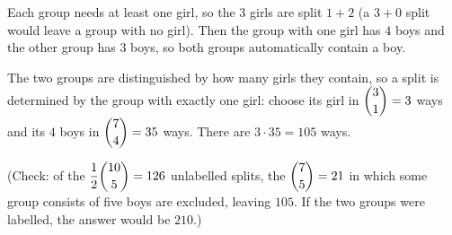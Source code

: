 Each group needs at least one girl, so the $3$ girls are split $1+2$ (a $3+0$ split would leave a group with no girl). Then the group with one girl has $4$ boys and the other group has $3$ boys, so both groups automatically contain a boy.

The two groups are distinguished by how many girls they contain, so a split is determined by the group with exactly one girl: choose its girl in $\dbinom31=3$ ways and its $4$ boys in $\dbinom74=35$ ways. There are $3\cdot35=\boxed{105}$ ways.

(Check: of the $\dfrac{1}{2}\dbinom{10}{5}=126$ unlabelled splits, the $\dbinom75=21$ in which some group consists of five boys are excluded, leaving $105$. If the two groups were labelled, the answer would be $210$.)
